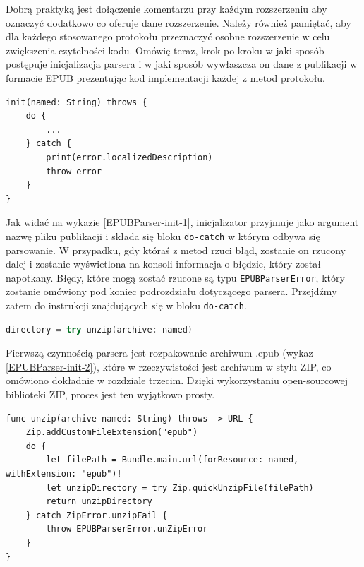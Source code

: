 Dobrą praktyką jest dołączenie komentarzu przy każdym rozszerzeniu aby oznaczyć dodatkowo co oferuje dane rozszerzenie. Należy również pamiętać, aby dla każdego stosowanego protokołu przeznaczyć osobne rozszerzenie w celu zwiększenia czytelności kodu. Omówię teraz, krok po kroku w jaki sposób postępuje inicjalizacja parsera i w jaki sposób wywłaszcza on dane z publikacji w formacie EPUB prezentując kod implementacji każdej z metod protokołu.

\begin{lstlisting}[language=swift-reference,caption={Block \textit{do-catch} w inicjalizatorze \texttt{EPUBParser}},label=EPUBParser-init-1]
init(named: String) throws {
    do {
        ...
    } catch {
        print(error.localizedDescription)
        throw error
    }
}
\end{lstlisting}

Jak widać na wykazie \ref{EPUBParser-init-1}, inicjalizator przyjmuje jako argument nazwę pliku publikacji i składa się bloku \texttt{do-catch} w którym odbywa się parsowanie. W przypadku, gdy któraś z metod rzuci błąd, zostanie on rzucony dalej i zostanie wyświetlona na konsoli informacja o błędzie, który został napotkany. Błędy, które mogą zostać rzucone są typu \texttt{EPUBParserError}, który zostanie omówiony pod koniec podrozdziału dotyczącego parsera. Przejdźmy zatem do instrukcji znajdujących się w bloku \texttt{do-catch}.

\begin{lstlisting}[firstnumber=11, language=swift, caption={Próba rozpakowania archiwum},label=EPUBParser-init-2]
directory = try unzip(archive: named)
\end{lstlisting}

Pierwszą czynnością parsera jest rozpakowanie archiwum .epub (wykaz \ref{EPUBParser-init-2}), które w rzeczywistości jest archiwum w stylu ZIP, co omówiono dokładnie w rozdziale trzecim. Dzięki wykorzystaniu open-sourcowej biblioteki ZIP, proces jest ten wyjątkowo prosty.

\begin{lstlisting}[caption={Implementacja metody unzip (archive named:)},label=unzip,language=swift-reference]
func unzip(archive named: String) throws -> URL {
    Zip.addCustomFileExtension("epub")
    do {
        let filePath = Bundle.main.url(forResource: named, withExtension: "epub")!
        let unzipDirectory = try Zip.quickUnzipFile(filePath)
        return unzipDirectory
    } catch ZipError.unzipFail {
        throw EPUBParserError.unZipError
    }
}
\end{lstlisting}

